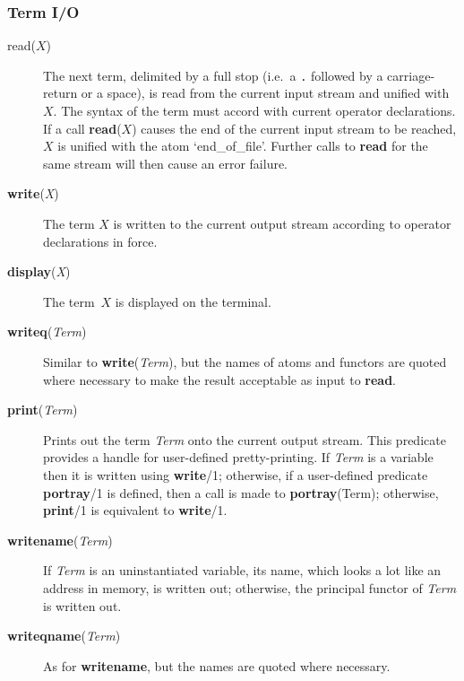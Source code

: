 \subsubsection{Term I/O}
 
\begin{description}
\item[read($X$)] 
    The next term, delimited by a full stop (i.e.\ a {\tt.}
    followed by a carriage-return
    or a space), is read from the current input stream and unified with~$X$.
    The syntax of the term must accord with current operator declarations.
    If a call {\bf read}($X$) causes the end of the
    current input stream to be reached, $X$ is unified with the atom
    `end\_of\_file'.
    Further calls to {\bf read} for the same stream will then
    cause an error failure.

\item[{\bf write}({\em X})] 
    The term $X$ is written to the current output stream according to
    operator declarations in force.

\item[{\bf display}({\em X})] 
    The term~$X$ is displayed on the terminal.

\item[{\bf writeq}({\em Term})] 
    Similar to {\bf write}({\em Term}), but the names of atoms and functors
    are quoted where necessary to make the result acceptable as input to
    {\bf read}.

\item[{\bf print}({\em Term})] 
    Prints out the term {\em Term} onto the current output stream.
    This predicate provides a handle for user-defined pretty-printing.
    If {\em Term} is a variable then it is written using {\bf write}/1;
    otherwise, if a user-defined predicate {\bf portray}/1 is defined,
    then a call is made to {\bf portray}(Term);
    otherwise, {\bf print}/1 is equivalent to {\bf write}/1.

\item[{\bf writename}({\em Term})] 
    If {\em Term} is an uninstantiated variable, its name, which
    looks a lot like an address in memory, is written out; otherwise, the
    principal functor of {\em Term} is written out.

\item[{\bf writeqname}({\em Term})]
    As for {\bf writename}, but the names are quoted where necessary.


\end{description}
